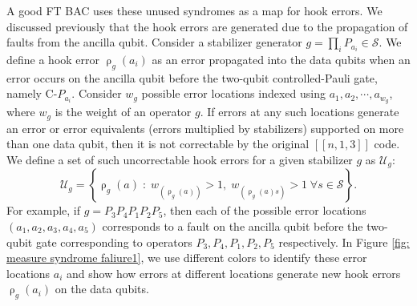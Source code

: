\documentclass[reprint, amsmath,amssymb, aps,pra,
 floatfix,
]{revtex4-2}
\begin{document}
\noindent A good FT BAC uses these unused syndromes as a map for hook errors.
We discussed previously that the hook errors are generated due to the propagation of faults from the ancilla qubit.
Consider a stabilizer generator $ g= \prod_{i} P_{a_i} \in \mathcal{S}$.
We define a hook error $\operatorname{\rho}_g(a_i)$ as an error propagated into the data qubits when an error occurs on the ancilla qubit before the two-qubit controlled-Pauli gate, namely C-$P_{a_i}$.
Consider $w_g$ possible error locations indexed using $a_1, a_2, \cdots, a_{w_g}$, where $w_g$ is the weight of an operator $g$.
If errors at any such locations generate an error or error equivalents (errors multiplied by stabilizers) supported on more than one data qubit, then it is not correctable by the original $[[n,1,3]]$ code.
We define a set of such uncorrectable hook errors for a given stabilizer $g$ as $\mathcal{U}_g$:
\[
\mathcal{U}_g = \left\{ \operatorname{\rho}_g(a) \; : \; w_{(\operatorname{\rho}_g(a))} > 1,\; w_{(\operatorname{\rho}_g(a)s)} > 1 \; \forall s \in \mathcal{S} \right\}.
\]
For example, if $g= P_3P_4P_1P_2P_5$, then each of the possible error locations $(a_1,a_2,a_3,a_4,a_5)$ corresponds to a fault on the ancilla qubit before the two-qubit gate corresponding to operators $P_3, P_4, P_1, P_2, P_5$ respectively.
In Figure \ref{fig: measure syndrome faliure1}, we use different colors to identify these error locations $a_i$ and show how errors at different locations generate new hook errors $\operatorname{\rho}_g(a_i)$ on the data qubits.
\end{document}

